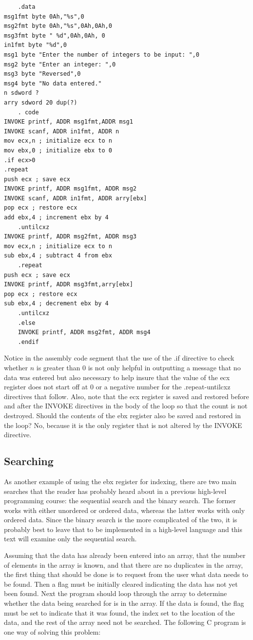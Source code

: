 \documentclass[10pt]{book}
\begin{document}
\begin{verbatim}
    .data
msg1fmt byte 0Ah,"%s",0
msg2fmt byte 0Ah,"%s",0Ah,0Ah,0
msg3fmt byte " %d",0Ah,0Ah, 0
in1fmt byte "%d",0
msg1 byte "Enter the number of integers to be input: ",0
msg2 byte "Enter an integer: ",0
msg3 byte "Reversed",0
msg4 byte "No data entered."
n sdword ?
arry sdword 20 dup(?)
    . code
INVOKE printf, ADDR msg1fmt,ADDR msg1
INVOKE scanf, ADDR in1fmt, ADDR n
mov ecx,n ; initialize ecx to n
mov ebx,0 ; initialize ebx to 0
.if ecx>0
.repeat
push ecx ; save ecx
INVOKE printf, ADDR msg1fmt, ADDR msg2
INVOKE scanf, ADDR in1fmt, ADDR arry[ebx]
pop ecx ; restore ecx
add ebx,4 ; increment ebx by 4
    .untilcxz
INVOKE printf, ADDR msg2fmt, ADDR msg3
mov ecx,n ; initialize ecx to n
sub ebx,4 ; subtract 4 from ebx
    .repeat
push ecx ; save ecx
INVOKE printf, ADDR msg3fmt,arry[ebx]
pop ecx ; restore ecx
sub ebx,4 ; decrement ebx by 4
    .untilcxz
    .else
    INVOKE printf, ADDR msg2fmt, ADDR msg4
    .endif
\end{verbatim}

Notice in the assembly code segment that the use of the .if directive to check whether $n$ is greater than 0 is not only helpful in outputting a message that no data was entered but also necessary to help insure that the value of the ecx register does not start off at 0 or a negative number for the .repeat-untilcxz directives that follow. Also, note that the ecx register is saved and restored before and after the INVOKE directives in the body of the loop so that the count is not destroyed. Should the contents of the ebx register also be saved and restored in the loop? No, because it is the only register that is not altered by the INVOKE directive.

\subsection{Searching}
As another example of using the ebx register for indexing, there are two main searches that the reader has probably heard about in a previous high-level programming course: the sequential search and the binary search. The former works with either unordered or ordered data, whereas the latter works with only ordered data. Since the binary search is the more complicated of the two, it is probably best to leave that to be implemented in a high-level language and this text will examine only the sequential search.


Assuming that the data has already been entered into an array, that the number of elements in the array is known, and that there are no duplicates in the array, the first thing that should be done is to request from the user what data needs to be found. Then a flag must be initially cleared indicating the data has not yet been found. Next the program should loop through the array to determine whether the data being searched for is in the array. If the data is found, the flag must be set to indicate that it was found, the index set to the location of the data, and the rest of the array need not be searched. The following C program is one way of solving this problem:
\end{document}
